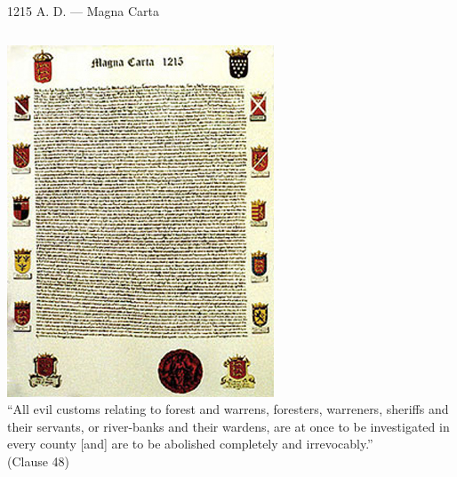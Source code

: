 \begin{frame}{1215 A. D. --- Magna Carta}
    \begin{columns}[onlytextwidth]
            \centering
            \includegraphics[height=0.55\textheight]{img/magna-carta.png} \\

            ``All evil customs relating to forest and warrens, foresters, warreners, sheriffs and their servants, or river-banks and their wardens, are at once to be investigated in every county  [and] are to be abolished completely and irrevocably.'' \\
            (Clause 48)
    \end{columns}
\end{frame}

%

